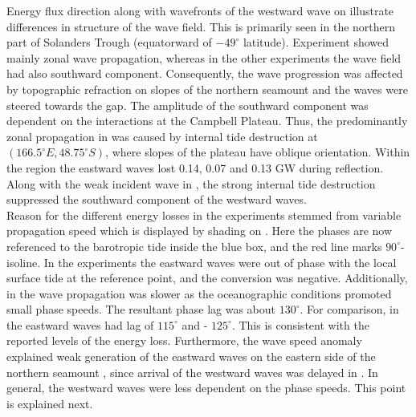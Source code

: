 \documentclass[12pt]{article}
\begin{document}
Energy flux direction along with wavefronts of the westward wave on 
 illustrate differences in structure of the wave field. This is 
primarily seen in the northern part of Solanders Trough (equatorward of $-49^{\circ}$ latitude). 
Experiment 
 showed mainly zonal wave propagation, whereas in the other experiments the wave field  
had also southward component. Consequently, the wave progression was affected by topographic 
refraction on slopes of the northern seamount and the waves were steered towards the gap. The 
amplitude 
of the southward component was dependent on the interactions at the Campbell Plateau. 
Thus, the predominantly zonal propagation in  was caused by internal 
tide 
destruction at $(166.5^{\circ}E, 48.75^{\circ}S)$,  where 
slopes of the plateau have oblique orientation. Within the region the eastward waves lost 
0.14, 0.07 and 0.13 GW during reflection. Along 
with the weak incident wave  in , the strong internal tide 
destruction suppressed the southward component of the westward waves.\\

Reason for the different energy losses in the experiments stemmed from variable propagation speed 
which is displayed by 
shading on . Here the phases are now referenced to the barotropic 
tide inside the blue box, and the red line marks $90^{\circ}$-isoline. In the experiments 
the eastward waves were out of phase with the local surface tide at the reference point, and the 
conversion was negative. Additionally, in  the wave propagation was slower as the 
oceanographic conditions promoted small phase speeds. The resultant phase lag was about 
$130^{\circ}$. For comparison, in  
the eastward waves had lag of $115^{\circ}$ and  - $125^{\circ}$. This 
is consistent with the reported levels of the energy loss. Furthermore, the wave speed anomaly 
explained weak generation of the eastward waves on the eastern side of the northern seamount  
, since arrival of the westward waves 
was delayed in  . 
In general, the westward waves were less dependent on the phase speeds. This point is 
explained next.\\
\end{document}

